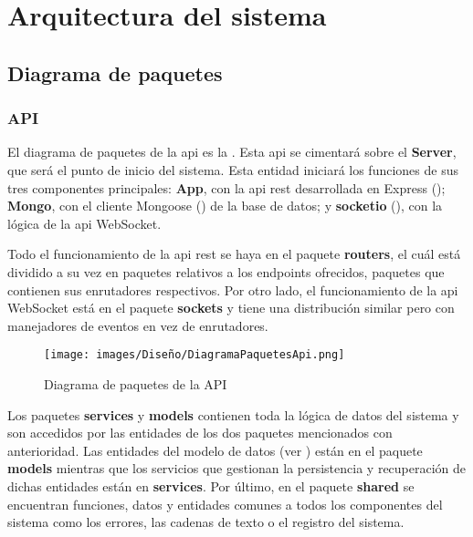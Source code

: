 \chapter{Arquitectura del sistema}
\label{ch:arquitectura}

\section{Diagrama de paquetes}

\subsection{API}

El diagrama de paquetes de la \acrshort{api} es la . Esta \acrshort{api} se cimentará sobre el \textbf{Server}, que será el punto de inicio del sistema. Esta entidad iniciará los funciones de sus tres componentes principales: \textbf{App}, con la \acrshort{api} \acrshort{rest} desarrollada en Express (); \textbf{Mongo}, con el cliente Mongoose () de la base de datos; y \textbf{socketio} (), con la lógica de la \acrshort{api} WebSocket. 

Todo el funcionamiento de la \acrshort{api} \acrshort{rest} se haya en el paquete \textbf{routers}, el cuál está dividido a su vez en paquetes relativos a los \glspl{endpoint} ofrecidos, paquetes que contienen sus enrutadores respectivos. Por otro lado, el funcionamiento de la \acrshort{api} WebSocket está en el paquete \textbf{sockets} y tiene una distribución similar pero con manejadores de eventos en vez de enrutadores.

\begin{figure}[H]
    \centering
    \texttt{[image: images/Diseño/DiagramaPaquetesApi.png]}
    \caption{Diagrama de paquetes de la API}
    \label{fig:diagrama_paquetes_api}
\end{figure}

Los paquetes \textbf{services} y \textbf{models} contienen toda la lógica de datos del sistema y son accedidos por las entidades de los dos paquetes mencionados con anterioridad. Las entidades del modelo de datos (ver ) están en el paquete \textbf{models} mientras que los servicios que gestionan la persistencia y recuperación de dichas entidades están en \textbf{services}. Por último, en el paquete \textbf{shared} se encuentran funciones, datos y entidades comunes a todos los componentes del sistema como los errores, las cadenas de texto o el registro del sistema.

